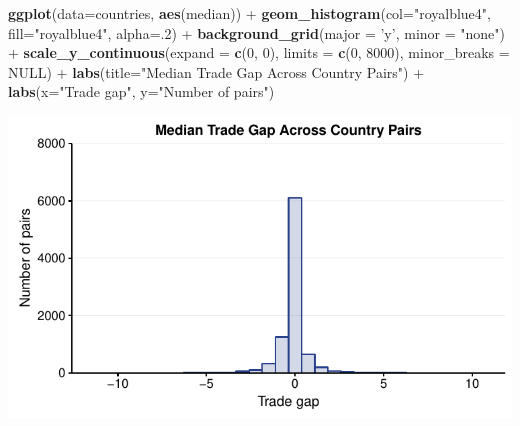 \documentclass[10pt,]{article}
\newenvironment{Shaded}{\begin{snugshade}}{\end{snugshade}}
\newcommand{\KeywordTok}[1]{\textcolor[rgb]{0.13,0.29,0.53}{\textbf{{#1}}}}
\newcommand{\DataTypeTok}[1]{\textcolor[rgb]{0.13,0.29,0.53}{{#1}}}
\newcommand{\DecValTok}[1]{\textcolor[rgb]{0.00,0.00,0.81}{{#1}}}
\newcommand{\StringTok}[1]{\textcolor[rgb]{0.31,0.60,0.02}{{#1}}}
\newcommand{\OtherTok}[1]{\textcolor[rgb]{0.56,0.35,0.01}{{#1}}}
\newcommand{\NormalTok}[1]{{#1}}
\begin{document}
\begin{Shaded}
\begin{Highlighting}[]
\KeywordTok{ggplot}\NormalTok{(}\DataTypeTok{data=}\NormalTok{countries, }\KeywordTok{aes}\NormalTok{(median)) +}
\StringTok{  }\KeywordTok{geom_histogram}\NormalTok{(}\DataTypeTok{col=}\StringTok{"royalblue4"}\NormalTok{,}
                 \DataTypeTok{fill=}\StringTok{"royalblue4"}\NormalTok{,}
                 \DataTypeTok{alpha=}\NormalTok{.}\DecValTok{2}\NormalTok{) +}
\StringTok{  }\KeywordTok{background_grid}\NormalTok{(}\DataTypeTok{major =} \StringTok{'y'}\NormalTok{, }\DataTypeTok{minor =} \StringTok{"none"}\NormalTok{) +}
\StringTok{  }\KeywordTok{scale_y_continuous}\NormalTok{(}\DataTypeTok{expand =} \KeywordTok{c}\NormalTok{(}\DecValTok{0}\NormalTok{, }\DecValTok{0}\NormalTok{), }\DataTypeTok{limits =} \KeywordTok{c}\NormalTok{(}\DecValTok{0}\NormalTok{, }\DecValTok{8000}\NormalTok{), }\DataTypeTok{minor_breaks =} \OtherTok{NULL}\NormalTok{) +}
\StringTok{  }\KeywordTok{labs}\NormalTok{(}\DataTypeTok{title=}\StringTok{"Median Trade Gap Across Country Pairs"}\NormalTok{) +}
\StringTok{  }\KeywordTok{labs}\NormalTok{(}\DataTypeTok{x=}\StringTok{"Trade gap"}\NormalTok{, }\DataTypeTok{y=}\StringTok{"Number of pairs"}\NormalTok{)}
\end{Highlighting}
\end{Shaded}

\begin{center}\includegraphics{Figs/value_summary-7} \end{center}
\end{document}
